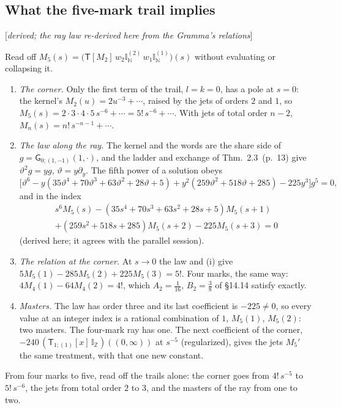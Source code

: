 \documentclass[11pt]{article}
\newcommand{\sG}{\mathsf G}
\newcommand{\sT}{\mathsf T}
\newcommand{\IZ}{\mathbb I_{\mathbb Z}}
\newcommand{\Tx}[3]{(\sT_{#1;(1)}[x]\,#2)((#3,\infty))}
\newcommand{\status}[1]{\hfill{\small[\textit{#1}]}}
\newcommand{\hb}[2]{#1~(p.~#2)}   %
\theoremstyle{plain}
\theoremstyle{remark}
\begin{document}
\subsection{What the five-mark trail implies}\status{derived; the ray law re-derived here from the Gramma's relations}

Read off $M_5(s)=\big(\sT[M_2]\,w_2\mathbb I^{(2)}_{\mathbb N}\,w_1\mathbb I^{(1)}_{\mathbb N}\big)(s)$ without evaluating or collapsing it.
\begin{enumerate}[label=(\roman*)]
\item \emph{The corner.} Only the first term of the trail, $l=k=0$, has a pole at $s=0$: the kernel's $M_2(u)=2u^{-3}+\cdots$, raised by the jets of orders $2$ and $1$, so $M_5(s)=2\cdot3\cdot4\cdot5\,s^{-6}+\cdots=5!\,s^{-6}+\cdots$. With jets of total order $n-2$, $M_n(s)=n!\,s^{-n-1}+\cdots$.
\item \emph{The law along the ray.} The kernel and the words are the share side of $g=\sG_{0;(1,-1)}(1,\cdot)$, and the ladder and exchange of Thm.~\hb{2.3}{13} give $\vartheta^2g=yg$, $\vartheta=y\partial_y$. The fifth power of a solution obeys
\[
\big[\vartheta^6-y(35\vartheta^4+70\vartheta^3+63\vartheta^2+28\vartheta+5)+y^2(259\vartheta^2+518\vartheta+285)-225y^3\big]g^5=0,
\]
and in the index
\begin{multline*}
s^6M_5(s)-(35s^4+70s^3+63s^2+28s+5)M_5(s+1)\\
+(259s^2+518s+285)M_5(s+2)-225M_5(s+3)=0
\end{multline*}
(derived here; it agrees with the parallel session).
\item \emph{The relation at the corner.} At $s\to0$ the law and (i) give $5M_5(1)-285M_5(2)+225M_5(3)=5!$. Four marks, the same way: $4M_4(1)-64M_4(2)=4!$, which $A_2=\frac1{16}$, $B_2=\frac38$ of \S14.14 satisfy exactly.
\item \emph{Masters.} The law has order three and its last coefficient is $-225\neq0$, so every value at an integer index is a rational combination of $1$, $M_5(1)$, $M_5(2)$: two masters. The four-mark ray has one. The next coefficient of the corner, $-240\,\Tx1\IZ0$ at $s^{-5}$ (regularized), gives the jets $M_5'$ the same treatment, with that one new constant.
\end{enumerate}
From four marks to five, read off the trails alone: the corner goes from $4!\,s^{-5}$ to $5!\,s^{-6}$, the jets from total order $2$ to $3$, and the masters of the ray from one to two.
\end{document}
